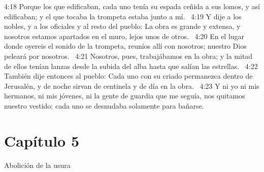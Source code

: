 4:18 Porque los que edificaban, cada uno tenía su espada ceñida a sus lomos, y así edificaban; y el que tocaba la trompeta estaba junto a mí.  
4:19 Y dije a los nobles, y a los oficiales y al resto del pueblo: La obra es grande y extensa, y nosotros estamos apartados en el muro, lejos unos de otros.  
4:20 En el lugar donde oyereis el sonido de la trompeta, reuníos allí con nosotros; nuestro Dios peleará por nosotros.  
4:21 Nosotros, pues, trabajábamos en la obra; y la mitad de ellos tenían lanzas desde la subida del alba hasta que salían las estrellas.  
4:22 También dije entonces al pueblo: Cada uno con su criado permanezca dentro de Jerusalén, y de noche sirvan de centinela y de día en la obra.  
4:23 Y ni yo ni mis hermanos, ni mis jóvenes, ni la gente de guardia que me seguía, nos quitamos nuestro vestido; cada uno se desnudaba solamente para bañarse.  
\section*{Capítulo 5 }
Abolición de la usura  

